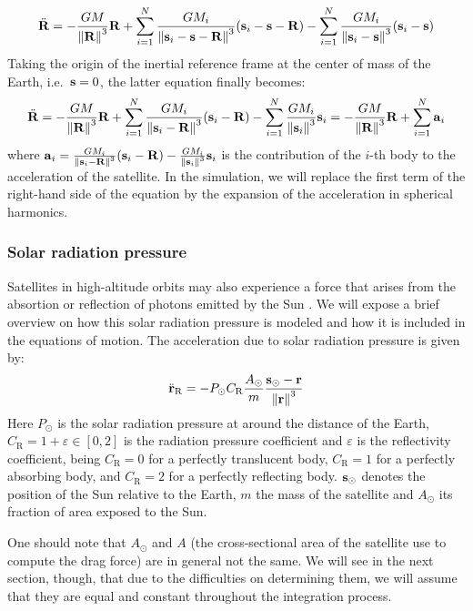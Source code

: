 \documentclass[../main.tex]{subfiles}
\begin{document}
\begin{equation}
  \ddot{\boldsymbol{\mathrm{R}}}=-\frac{GM}{\left\|\boldsymbol{\mathrm{R}}\right\|^3}\boldsymbol{\mathrm{R}}+\sum_{i=1}^N\frac{GM_i}{\left\|\boldsymbol{\mathrm{s}}_i-\boldsymbol{\mathrm{s}}-\boldsymbol{\mathrm{R}}\right\|^3}(\boldsymbol{\mathrm{s}}_i-\boldsymbol{\mathrm{s}}-\boldsymbol{\mathrm{R}})-\sum_{i=1}^N\frac{GM_i}{\left\|\boldsymbol{\mathrm{s}}_i-\boldsymbol{\mathrm{s}}\right\|^3}(\boldsymbol{\mathrm{s}}_i-\boldsymbol{\mathrm{s}})
\end{equation}
Taking the origin of the inertial reference frame at the center of mass of the Earth, i.e.\ $\boldsymbol{\mathrm{s}}=0$, the latter equation finally becomes:
\begin{equation}
  \ddot{\boldsymbol{\mathrm{R}}}=-\frac{GM}{\left\|\boldsymbol{\mathrm{R}}\right\|^3}\boldsymbol{\mathrm{R}}+\sum_{i=1}^N\frac{GM_i}{\left\|\boldsymbol{\mathrm{s}}_i-\boldsymbol{\mathrm{R}}\right\|^3}(\boldsymbol{\mathrm{s}}_i-\boldsymbol{\mathrm{R}})-\sum_{i=1}^N\frac{GM_i}{\left\|\boldsymbol{\mathrm{s}}_i\right\|^3}\boldsymbol{\mathrm{s}}_i=-\frac{GM}{\left\|\boldsymbol{\mathrm{R}}\right\|^3}\boldsymbol{\mathrm{R}}+\sum_{i=1}^N\boldsymbol{\mathrm{a}}_i
\end{equation}
where $\boldsymbol{\mathrm{a}}_i=\frac{GM_i}{\left\|\boldsymbol{\mathrm{s}}_i-\boldsymbol{\mathrm{R}}\right\|^3}(\boldsymbol{\mathrm{s}}_i-\boldsymbol{\mathrm{R}})-\frac{GM_i}{\left\|\boldsymbol{\mathrm{s}}_i\right\|^3}\boldsymbol{\mathrm{s}}_i$ is the contribution of the $i$-th body to the acceleration of the satellite.
In the simulation, we will replace the first term of the right-hand side of the equation by the expansion of the acceleration in spherical harmonics.

\subsubsection{Solar radiation pressure}
Satellites in high-altitude orbits may also experience a force that arises from the absortion or reflection of photons emitted by the Sun \cite{montenbruck}. We will expose a brief overview on how this solar radiation pressure is modeled and how it is included in the equations of motion. The acceleration due to solar radiation pressure is given by:
\begin{equation}\label{eq:preSolarRad}
  \ddot{\boldsymbol{\mathrm{r}}}_{\mathrm{R}}=-P_{\odot} C_{\mathrm{R}} \frac{A_\odot}{m} \frac{\boldsymbol{\mathrm{s}}_\odot-\boldsymbol{\mathrm{r}}}{\left\|\boldsymbol{\mathrm{r}}\right\|^3}
\end{equation}
Here $P_{\odot}$ is the solar radiation pressure at around the distance of the Earth, $C_{\mathrm{R}}=1+\varepsilon\in [0,2]$ is the radiation pressure coefficient and $\varepsilon$ is the reflectivity coefficient, being $C_{\mathrm{R}}=0$ for a perfectly translucent body, $C_{\mathrm{R}}=1$ for a perfectly absorbing body, and $C_{\mathrm{R}}=2$ for a perfectly reflecting body. $\boldsymbol{\mathrm{s}}_\odot$ denotes the position of the Sun relative to the Earth, $m$ the mass of the satellite and $A_\odot$ its fraction of area exposed to the Sun.

One should note that $A_\odot$ and $A$ (the cross-sectional area of the satellite use to compute the drag force) are in general not the same. We will see in the next section, though, that due to the difficulties on determining them, we will assume that they are equal and constant throughout the integration process.
\end{document}
